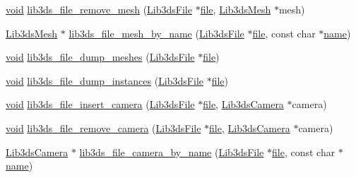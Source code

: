 \begin{DoxyCompactItemize}
\item 
\hyperlink{group___u_a_v_objects_plugin_ga444cf2ff3f0ecbe028adce838d373f5c}{void} \hyperlink{group__file_gaf611af4b8f17f550d1805f188093c79e}{lib3ds\-\_\-file\-\_\-remove\-\_\-mesh} (\hyperlink{struct_lib3ds_file}{Lib3ds\-File} $\ast$\hyperlink{uavobjecttemplate_8m_a97c04efa65bcf0928abf9260bc5cbf46}{file}, \hyperlink{struct_lib3ds_mesh}{Lib3ds\-Mesh} $\ast$mesh)
\item 
\hyperlink{struct_lib3ds_mesh}{Lib3ds\-Mesh} $\ast$ \hyperlink{group__file_ga25462523b0806dea3a03fb3934e8acda}{lib3ds\-\_\-file\-\_\-mesh\-\_\-by\-\_\-name} (\hyperlink{struct_lib3ds_file}{Lib3ds\-File} $\ast$\hyperlink{uavobjecttemplate_8m_a97c04efa65bcf0928abf9260bc5cbf46}{file}, const char $\ast$\hyperlink{glext_8h_ad977737dfc9a274a62741b9500c49a32}{name})
\item 
\hyperlink{group___u_a_v_objects_plugin_ga444cf2ff3f0ecbe028adce838d373f5c}{void} \hyperlink{group__file_gad2b5c0121a1f1134caaa4bdc3fb0351f}{lib3ds\-\_\-file\-\_\-dump\-\_\-meshes} (\hyperlink{struct_lib3ds_file}{Lib3ds\-File} $\ast$\hyperlink{uavobjecttemplate_8m_a97c04efa65bcf0928abf9260bc5cbf46}{file})
\item 
\hyperlink{group___u_a_v_objects_plugin_ga444cf2ff3f0ecbe028adce838d373f5c}{void} \hyperlink{group__file_ga4e36f5e5ff98d9bdf2b6e40e76957afc}{lib3ds\-\_\-file\-\_\-dump\-\_\-instances} (\hyperlink{struct_lib3ds_file}{Lib3ds\-File} $\ast$\hyperlink{uavobjecttemplate_8m_a97c04efa65bcf0928abf9260bc5cbf46}{file})
\item 
\hyperlink{group___u_a_v_objects_plugin_ga444cf2ff3f0ecbe028adce838d373f5c}{void} \hyperlink{group__file_ga467014975b271a47c5e2ff3ced66dd81}{lib3ds\-\_\-file\-\_\-insert\-\_\-camera} (\hyperlink{struct_lib3ds_file}{Lib3ds\-File} $\ast$\hyperlink{uavobjecttemplate_8m_a97c04efa65bcf0928abf9260bc5cbf46}{file}, \hyperlink{struct_lib3ds_camera}{Lib3ds\-Camera} $\ast$camera)
\item 
\hyperlink{group___u_a_v_objects_plugin_ga444cf2ff3f0ecbe028adce838d373f5c}{void} \hyperlink{group__file_ga4955de73994703b857422a7792f73e9f}{lib3ds\-\_\-file\-\_\-remove\-\_\-camera} (\hyperlink{struct_lib3ds_file}{Lib3ds\-File} $\ast$\hyperlink{uavobjecttemplate_8m_a97c04efa65bcf0928abf9260bc5cbf46}{file}, \hyperlink{struct_lib3ds_camera}{Lib3ds\-Camera} $\ast$camera)
\item 
\hyperlink{struct_lib3ds_camera}{Lib3ds\-Camera} $\ast$ \hyperlink{group__file_gaeee9b2528e356387eab82eaec4fa591e}{lib3ds\-\_\-file\-\_\-camera\-\_\-by\-\_\-name} (\hyperlink{struct_lib3ds_file}{Lib3ds\-File} $\ast$\hyperlink{uavobjecttemplate_8m_a97c04efa65bcf0928abf9260bc5cbf46}{file}, const char $\ast$\hyperlink{glext_8h_ad977737dfc9a274a62741b9500c49a32}{name})

\end{DoxyCompactItemize}
